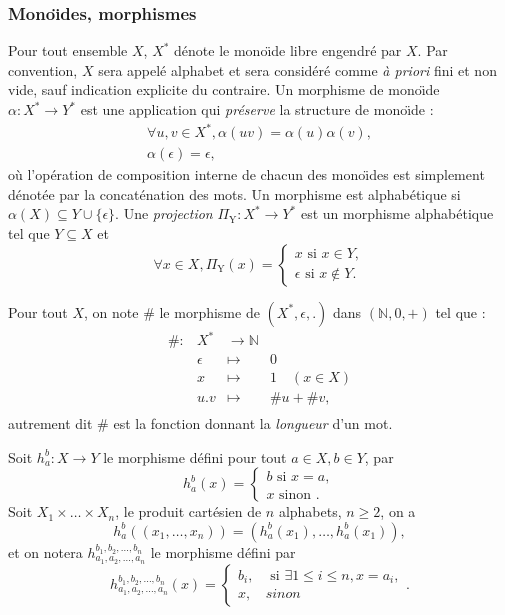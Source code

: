 \subsubsection{Mono\"{\i}des, morphismes}

Pour tout ensemble $X$, $X^*$ d\'enote le mono\"{\i}de libre engendr\'e par
$X$. Par convention, $X$ sera appel\'e alphabet et sera
consid\'er\'e comme \emph{\`a priori} fini et non vide, sauf
indication explicite du contraire. Un morphisme de mono\"{\i}de
$\alpha:X^* \rightarrow Y^*$ est une 
application qui \emph{pr\'eserve} la structure de mono\"{\i}de : 
\begin{eqnarray}
\forall u,v \in X^*, \alpha(uv)=\alpha(u)\alpha(v),\label{eq:monoide} \\
\alpha(\epsilon)=\epsilon ,
\end{eqnarray} 
o\`u l'op\'eration de composition interne de chacun des mono\"{\i}des
est simplement d\'enot\'ee par la concat\'enation des mots. Un morphisme
est alphab\'etique si $\alpha(X)\subseteq Y\cup \{\epsilon\}$. Une
\emph{projection} $\Pi_{\mathrm Y}:X^* \rightarrow Y^*$ est un morphisme
alphab\'etique tel que $Y\subseteq X$ et 
$$\forall x \in X, \Pi_{{\mathrm Y}}(x) =
\left\{\begin{array}{l}x \mbox{~si~} x \in Y,\\ 
\epsilon \mbox{~si~} x \not\in Y.
\end{array}\right.$$

Pour tout $X$, on note $\#$ le morphisme de $(X^*,\epsilon,.)$ dans $(\mathbb{N},0,+)$ tel que :
$$
\begin{array}{lrcl}
\#:&X^*&\rightarrow \mathbb{N} \\
&\epsilon&\mapsto&0\\
&x&\mapsto&1\quad (x\in X) \\
&u.v&\mapsto& \#u+\#v, \\
\end{array}
$$
autrement dit $\#$ est la fonction donnant la \emph{longueur} d'un mot. 

Soit $h_a^b : X\rightarrow Y$ le morphisme d\'efini pour tout $a\in
X, b\in Y$, par 
$$
h_a^b(x) =\left\{\begin{array}{l}b \mbox{~si~} x=a,\\ 
x \mbox{~sinon~}.
\end{array}\right.
$$
Soit $X_1\times{}\dots \times{}X_n$, le produit cart\'esien de $n$
alphabets, $n\geq 2$, on a 
$$
h_{a}^b((x_1,\dots,x_n)) = (h_a^b(x_1),\dots,h_a^b(x_1)),
$$
et on notera $h_{a_1,a_2,\dots,a_n}^{b_1,b_2,\dots,b_n}$ le morphisme
d\'efini par 
$$
h_{a_1,a_2,\dots,a_n}^{b_1,b_2,\dots,b_n}(x) = \left\{\begin{array}{ll}
        b_i, &\mbox{~si~} \exists 1\leq i\leq n, x = a_i,\\
        x, &sinon 
\end{array}\right..
$$

